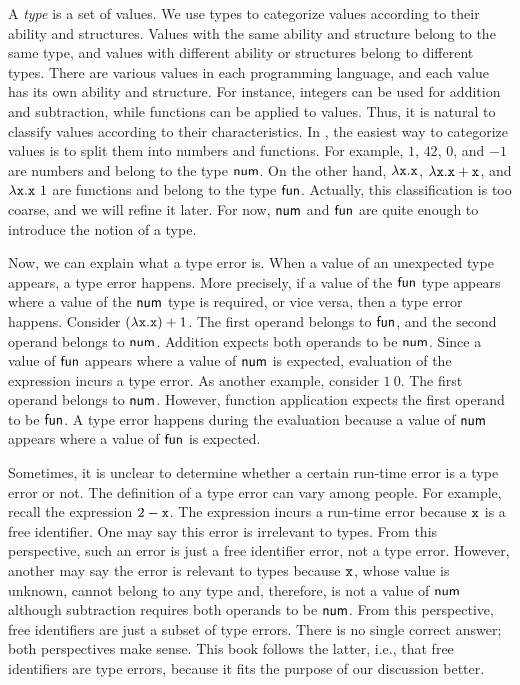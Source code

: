A \textit{type}
is a set of values. We use types to categorize values according to their
ability and structures. Values with the same ability and structure belong to the
same type, and values with different ability or structures belong to different
types. There are various values in each programming language, and each value has its
own ability and structure. For instance, integers can be used for addition and
subtraction, while functions can be applied to values. Thus, it is natural to
classify values according to their characteristics. In \lang, the easiest way to
categorize values is to split them into numbers and functions. For example, $1$,
$42$, $0$, and $-1$ are numbers and belong to the type $\textsf{num}$.
On the other hand, $\lambda \texttt{x}.\texttt{x}$, $\lambda \texttt{x}.\texttt{x}+\texttt{x}$, and $\lambda \texttt{x}.\texttt{x}\ 1$
are functions and belong to the type $\textsf{fun}$. Actually, this classification is
too coarse, and we will refine it later. For now, $\textsf{num}$ and $\textsf{fun}$ are quite
enough to introduce the notion of a type.

Now, we can explain what a type error is. When a value of an unexpected type
appears, a type error happens. More precisely, if a value of the $\textsf{fun}$ type
appears where a value of the $\textsf{num}$ type is required, or vice versa, then a
type error happens. Consider $(\lambda \texttt{x}.\texttt{x})+1$. The first operand belongs
to $\textsf{fun}$, and the second operand belongs to $\textsf{num}$. Addition expects both
operands to be $\textsf{num}$. Since a value of $\textsf{fun}$ appears where a value of
$\textsf{num}$ is expected, evaluation of the expression incurs a type error.
As another example, consider $1\ 0$. The first operand belongs to $\textsf{num}$.
However, function application expects the first operand to be $\textsf{fun}$. A type
error happens during the evaluation because a value of $\textsf{num}$ appears where a
value of $\textsf{fun}$ is expected.

Sometimes, it is unclear to determine whether a certain run-time error is a type error
or not. The definition of a type error can vary among people. For example,
recall the expression $2-\texttt{x}$. The expression incurs a run-time error because
$\texttt{x}$ is a free identifier. One may say this error is irrelevant to types. From
this perspective, such an error is just a free identifier error, not a type
error. However, another may say the error is relevant to types because
$\texttt{x}$, whose value is unknown, cannot belong to any type and, therefore, is not a
value of $\textsf{num}$ although subtraction requires both operands to be $\textsf{num}$.
From this perspective, free identifiers are just a subset of type errors. There is
no single correct answer; both perspectives make sense. This book follows the
latter, i.e., that free identifiers are type errors, because it fits the purpose
of our discussion better.

